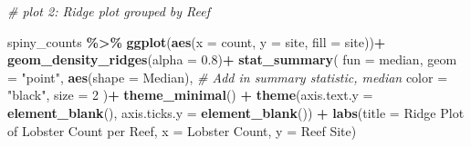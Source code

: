 \documentclass[
]{article}
\newenvironment{Shaded}{\begin{snugshade}}{\end{snugshade}}
\newcommand{\AttributeTok}[1]{\textcolor[rgb]{0.13,0.29,0.53}{#1}}
\newcommand{\CommentTok}[1]{\textcolor[rgb]{0.56,0.35,0.01}{\textit{#1}}}
\newcommand{\DecValTok}[1]{\textcolor[rgb]{0.00,0.00,0.81}{#1}}
\newcommand{\FloatTok}[1]{\textcolor[rgb]{0.00,0.00,0.81}{#1}}
\newcommand{\FunctionTok}[1]{\textcolor[rgb]{0.13,0.29,0.53}{\textbf{#1}}}
\newcommand{\NormalTok}[1]{#1}
\newcommand{\SpecialCharTok}[1]{\textcolor[rgb]{0.81,0.36,0.00}{\textbf{#1}}}
\newcommand{\StringTok}[1]{\textcolor[rgb]{0.31,0.60,0.02}{#1}}
\begin{document}
\begin{Shaded}
\begin{Highlighting}[]
\CommentTok{\# plot 2: Ridge plot grouped by Reef}

\NormalTok{spiny\_counts }\SpecialCharTok{\%\textgreater{}\%} 
\FunctionTok{ggplot}\NormalTok{(}\FunctionTok{aes}\NormalTok{(}\AttributeTok{x =}\NormalTok{ count, }\AttributeTok{y =}\NormalTok{ site, }\AttributeTok{fill =}\NormalTok{ site))}\SpecialCharTok{+}
    \FunctionTok{geom\_density\_ridges}\NormalTok{(}\AttributeTok{alpha =} \FloatTok{0.8}\NormalTok{)}\SpecialCharTok{+}
     \FunctionTok{stat\_summary}\NormalTok{(}
        \AttributeTok{fun =}\NormalTok{ median, }
        \AttributeTok{geom =} \StringTok{"point"}\NormalTok{,}
        \FunctionTok{aes}\NormalTok{(}\AttributeTok{shape =} \StringTok{\textquotesingle{}Median\textquotesingle{}}\NormalTok{), }\CommentTok{\# Add in summary statistic, median}
        \AttributeTok{color =} \StringTok{"black"}\NormalTok{, }
        \AttributeTok{size =} \DecValTok{2}
\NormalTok{    )}\SpecialCharTok{+}
    \FunctionTok{theme\_minimal}\NormalTok{() }\SpecialCharTok{+} 
    \FunctionTok{theme}\NormalTok{(}\AttributeTok{axis.text.y =} \FunctionTok{element\_blank}\NormalTok{(),}
        \AttributeTok{axis.ticks.y =} \FunctionTok{element\_blank}\NormalTok{()) }\SpecialCharTok{+}
     \FunctionTok{labs}\NormalTok{(}\AttributeTok{title =} \StringTok{\textquotesingle{}Ridge Plot of Lobster Count per Reef\textquotesingle{}}\NormalTok{,}
         \AttributeTok{x =} \StringTok{\textquotesingle{}Lobster Count\textquotesingle{}}\NormalTok{,}
         \AttributeTok{y =} \StringTok{\textquotesingle{}Reef Site\textquotesingle{}}\NormalTok{)}
\end{Highlighting}
\end{Shaded}
\end{document}
